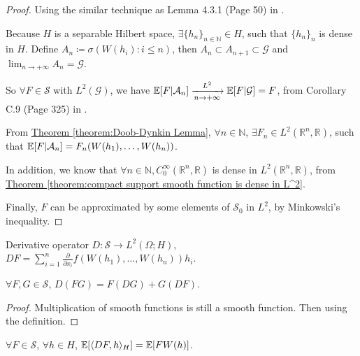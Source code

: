 \begin{proof}
Using the similar technique as Lemma 4.3.1 (Page 50) in
\cite{StochasticDifferentialEquationsAnIntroductionwithApplications}. 

Because $H$ is a separable Hilbert space, 
$\exists \{h_n\}_{n \in \mathbb{N}} \in H$, such that $\{h_n\}_{n}$ is dense in  $H$. Define $A_n \coloneqq \sigma(W(h_i): i \leq n)$, then $A_n \subset A_{n+1} \subset \mathcal{G}$ and $\lim_{n \to +\infty} A_n = \mathcal{G}$. 

So $\forall F \in \mathcal{S}$ with $L^2(\mathcal{G})$, 
we have $\operatorname{\mathbb{E}}[F | \mathcal{A}_n] 
\xrightarrow[n \to +\infty]{L^2} 
\operatorname{\mathbb{E}}[F | \mathcal{G}] = F $, 
from Corollary C.9 (Page 325) in 
\cite{StochasticDifferentialEquationsAnIntroductionwithApplications}. 

From \hyperref[theorem:Doob-Dynkin Lemma]
{Theorem \ref*{theorem:Doob-Dynkin Lemma}}, 
$\forall n \in \mathbb{N}$, $\exists F_n \in L^2(\mathbb{R}^n, \mathbb{R})$, 
such that $\operatorname{\mathbb{E}}[F | \mathcal{A}_n] = F_n(W(h_1), \dots, W(h_n))$. 

In addition, we know that $\forall n \in \mathbb{N}, C_{0}^{\infty}(\mathbb{R}^n, \mathbb{R})$ is dense in $L^2(\mathbb{R}^n, \mathbb{R})$, 
from \hyperref[theorem:compact support smooth function is dense in L^2]
{Theorem \ref*{theorem:compact support smooth function is dense in L^2}}. 

Finally, $F$ can be approximated by some elements of $\mathcal{S}_{0}$ in $L^2$, by Minkowski's inequality.  
\end{proof}

\begin{definition}[derivative]
Derivative operator $D : \mathcal{S} \to L^2(\Omega; H)$, 
$DF = \sum_{i=1}^{n} \frac{\partial }{\partial x_i} f(W(h_1), \dots, W(h_n)) h_i$. 
\end{definition}

\begin{lemma}
\label{lemma:rule}
$\forall F, G \in \mathcal{S}$, 
$D(FG) = F(DG) + G(DF)$. 
\end{lemma}

\begin{proof}
Multiplication of smooth functions is still a smooth function. Then using the definition. 
\end{proof}

\begin{proposition}
\label{proposition:one variable}
$\forall F \in \mathcal{S}$, $\forall h \in H$, 
$\operatorname{\mathbb{E}}[\langle DF, h \rangle_{H}] 
= \operatorname{\mathbb{E}}[FW(h)]$. 
\end{proposition}

